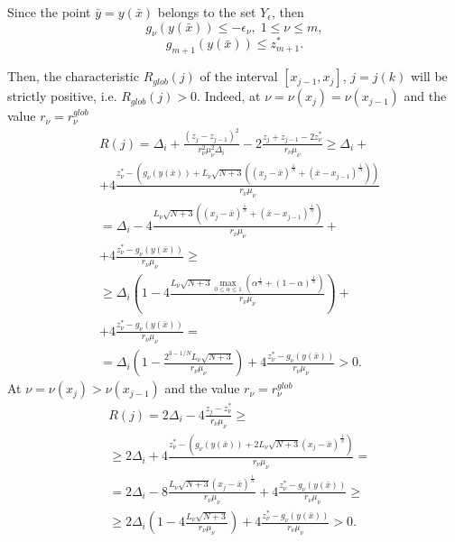 \documentclass[twocolumn]{svjour3}          %
\begin{document}
	Since the point $\bar y = y(\bar x)$ belongs to the set $Y_{\epsilon}$, then
\begin{equation*}
	g_{\nu}\left( y(\bar x) \right) \leq -\epsilon_{\nu}, \; 1\leq\nu\leq m,
\end{equation*}
\begin{equation*}
	g_{m+1}\left( y(\bar x) \right) \leq z_{m+1}^\ast.
\end{equation*}

	Then, the characteristic $R_{glob}(j)$ of the interval \break
$[x_{j-1}, x_j]$, $j=j(k)$ will be strictly positive, i.e. \break
$R_{glob}(j)>0$. Indeed, at $\nu=\nu(x_j)=\nu(x_{j-1})$ and the value $r_{\nu}=r_{\nu}^{glob}$
\small
\begin{align*}
	& R(j) = \Delta_i + \frac{(z_j-z_{j-1})^2}{r_{\nu}^2\mu_{\nu}^2\Delta_i} - 2\frac{z_j+z_{j-1}-2z_{\nu}^{\ast}}{r_{\nu}\mu_{\nu}} \geq \Delta_i + \\ 
	& + 4\frac{z_{\nu}^*-\left( g_{\nu}\left( y(\bar x) \right)+L_{\nu}\sqrt{N+3}\left( (x_j-\bar x)^{\frac{1}{N}}+(\bar x - x_{j-1})^{\frac{1}{N}} \right)\right)}{r_{\nu}\mu_{\nu}}\\
	& = \Delta_i-4\frac{L_{\nu}\sqrt{N+3}\left( (x_j-\bar x)^{\frac{1}{N}}+(\bar x - x_{j-1})^{\frac{1}{N}} \right)}{r_{\nu}\mu_{\nu}} + \\
	& + 4\frac{z_{\nu}^\ast-g_{\nu}\left( y(\bar x) \right)}{r_{\nu}\mu_{\nu}} \geq \\
	& \geq \Delta_i\left(1-4\frac{L_{\nu}\sqrt{N+3}\max_{0\leq\alpha\leq1} {\left( \alpha^{\frac{1}{N}}+(1-\alpha)^{\frac{1}{N}} \right)}}{r_{\nu}\mu_{\nu}} \right) + \\
	& + 4\frac{z_{\nu}^{\ast}-g_{\nu}\left( y(\bar x) \right)}{r_{\nu}\mu_{\nu}} = \\
	& = \Delta_i\left(1-\frac{2^{3-1/N}L_{\nu}\sqrt{N+3}}{r_{\nu}\mu_{\nu}} \right)+4\frac{z_{\nu}^{\ast}-g_{\nu}\left( y(\bar x) \right)}{r_{\nu}\mu_{\nu}} > 0.
\end{align*}
\normalsize
At $\nu=\nu(x_j ) > \nu(x_{j-1})$ and the value $r_{\nu}=r_{\nu}^{glob}$
\begin{align*}
	& R(j) = 2\Delta_i - 4\frac{z_j-z_{\nu}^{\ast}}{r_{\nu}\mu_{\nu}} \geq \\
	& \geq 2\Delta_i+4\frac{z_{\nu}^{\ast}-\left( g_{\nu}\left(y(\bar x)\right)+2L_{\nu}\sqrt{N+3}(x_j-\bar x)^{\frac{1}{N}} \right)}{r_{\nu}\mu_{\nu}} = \\
	& = 2\Delta_i - 8\frac{L_{\nu}\sqrt{N+3}(x_j-\bar x)^{\frac{1}{N}}}{r_{\nu}\mu_{\nu}}+4\frac{z_{\nu}^{\ast}-g_{\nu}\left( y(\bar x) \right)}{r_{\nu}\mu_{\nu}} \geq \\
	& \geq 2\Delta_i\left( 1-4\frac{L_{\nu}\sqrt{N+3}}{r_{\nu}\mu_{\nu}} \right) + 4\frac{z_{\nu}^{\ast}-g_{\nu}\left( y(\bar x) \right)}{r_{\nu}\mu_{\nu}} > 0.
\end{align*}
\end{document}
